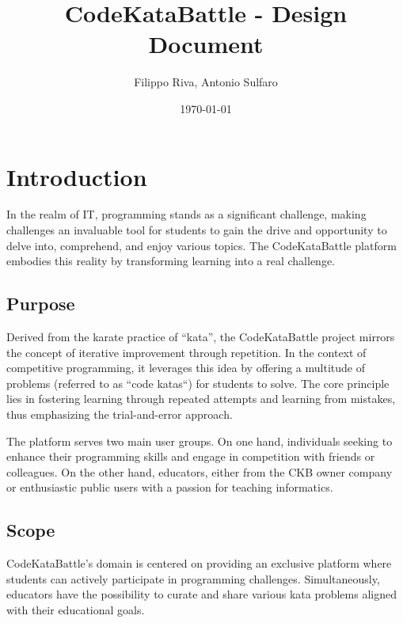 \documentclass[11pt]{report}
\title{CodeKataBattle - Design Document}
\author{Filippo Riva, Antonio Sulfaro}
\date{\today}
\begin{document}
\maketitle

\tableofcontents

\cleardoublepage












\chapter{Introduction}
    In the realm of IT, programming stands as a significant challenge, making challenges an invaluable tool for students to gain the drive and opportunity to delve into, comprehend, and enjoy various topics.
    The CodeKataBattle platform embodies this reality by transforming learning into a real challenge.

    \section{Purpose} \label{sec:purpose}
    Derived from the karate practice of ``kata'', the CodeKataBattle project mirrors the concept of iterative improvement through repetition.
    In the context of competitive programming, it leverages this idea by offering a multitude of problems (referred to as ``code katas``) for students to solve.
    The core principle lies in fostering learning through repeated attempts and learning from mistakes, thus emphasizing the trial-and-error approach.

    The platform serves two main user groups.
    On one hand, individuals seeking to enhance their programming skills and engage in competition with friends or colleagues.
    On the other hand, educators, either from the CKB owner company or enthusiastic public users with a passion for
    teaching informatics.

\section{Scope}
    CodeKataBattle's domain is centered on providing an exclusive platform where students can actively participate in programming challenges.
    Simultaneously, educators have the possibility to curate and share various kata problems aligned with their educational goals.
\end{document}
